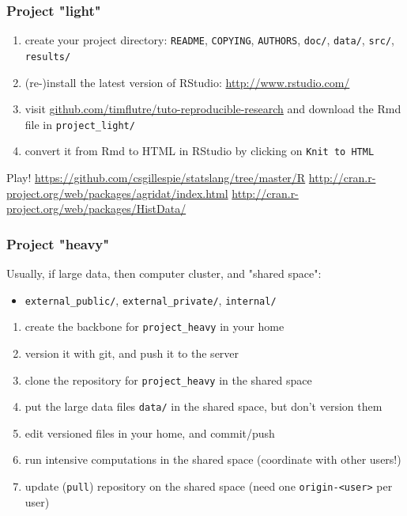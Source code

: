 \documentclass[c]{beamer} %
\begin{document}
\begin{frame}[fragile]
  \frametitle{Project "light"}
  \begin{enumerate}
  \item create your project directory: \verb+README+, \verb+COPYING+, \verb+AUTHORS+, \verb+doc/+, \verb+data/+, \verb+src/+, \verb+results/+
  \item (re-)install the latest version of RStudio: \url{http://www.rstudio.com/}
  \item visit \href{https://github.com/timflutre/tuto-reproducible-research}{github.com/timflutre/tuto-reproducible-research} and download the Rmd file in \verb+project_light/+
  \item convert it from Rmd to HTML in RStudio by clicking on \verb+Knit to HTML+
  \end{enumerate}
  \bigskip
  \pause
  Play!
  \small
  \url{https://github.com/csgillespie/statslang/tree/master/R}
  \url{http://cran.r-project.org/web/packages/agridat/index.html}
  \url{http://cran.r-project.org/web/packages/HistData/}
\end{frame}

\begin{frame}[fragile]
  \frametitle{Project "heavy"}
  Usually, if large data, then computer cluster, and "shared space":
  \begin{itemize}
  \item \verb+external_public/+, \verb+external_private/+, \verb+internal/+
  \end{itemize}
  
  \bigskip
  \pause
  
  \begin{enumerate}
  \item create the backbone for \verb+project_heavy+ in your home
  \item version it with git, and push it to the server
  \item clone the repository for \verb+project_heavy+ in the shared space
  \item put the large data files \verb+data/+ in the shared space, but don't version them
  \item edit versioned files in your home, and commit/push
  \item run intensive computations in the shared space (coordinate with other users!)
  \item update (\verb+pull+) repository on the shared space (need one \verb+origin-<user>+ per user)
  \end{enumerate}
\end{frame}
\end{document}
